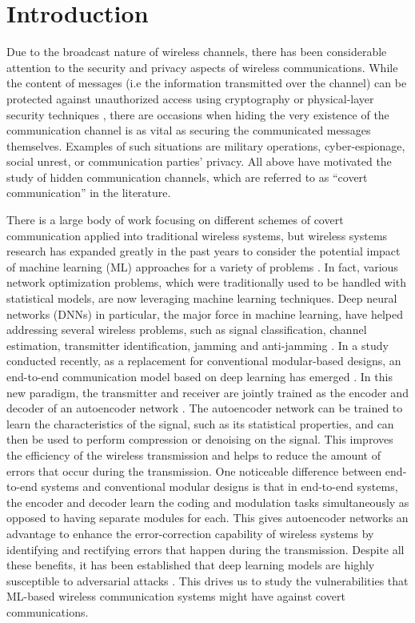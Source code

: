 \section{Introduction}
\label{s:intro}
Due to the broadcast nature of wireless channels, there has been considerable attention to the security and privacy aspects of wireless communications. While the content of messages (i.e the information transmitted over the channel) can be protected against unauthorized access using cryptography or physical-layer security techniques \cite{zhou2013physical}, there are occasions when hiding the very existence of the communication channel is as vital as securing the communicated messages themselves. Examples of such situations are military operations, cyber-espionage, social unrest, or communication parties' privacy. All above have motivated the study of hidden communication channels, which are referred to as ``covert communication'' \cite{lampson1973note} in the literature.

There is a large body of work focusing on different schemes of covert communication applied into traditional wireless systems, but wireless systems research has expanded greatly in the past years to consider the potential impact of machine learning (ML) approaches for a variety of problems \cite{wang2017deep}. In fact, various network optimization problems, which were traditionally used to be handled with statistical models, are now leveraging machine learning techniques. Deep neural networks (DNNs) in particular, the major force in machine learning, have helped addressing several wireless problems, such as signal classification, channel estimation, transmitter identification, jamming and anti-jamming \cite{bahramali2021robust}. In a study conducted recently, as a replacement for conventional modular-based designs, an end-to-end communication model based on deep learning has emerged \cite{o2017introduction}. In this new paradigm, the transmitter and receiver are jointly trained as the encoder and decoder of an autoencoder network \cite{baldi2012autoencoders}. The autoencoder network can be trained to learn the characteristics of the signal, such as its statistical properties, and can then be used to perform compression or denoising on the signal. This improves the efficiency of the wireless transmission and helps to reduce the amount of errors that occur during the transmission. One noticeable difference between end-to-end systems and conventional modular designs is that in end-to-end systems, the encoder and decoder learn the coding and modulation tasks simultaneously as opposed to having separate modules for each. This gives autoencoder networks an advantage to enhance the error-correction capability of wireless systems by identifying and rectifying errors that happen during the transmission. Despite all these benefits, it has been established that deep learning models are highly susceptible to adversarial attacks \cite{bahramali2021robust, chakraborty2018adversarial}. This drives us to study the vulnerabilities that ML-based wireless communication systems might have against covert communications.

